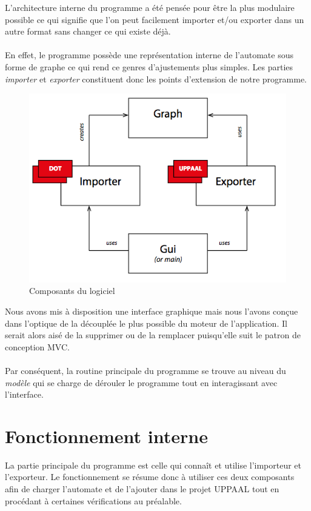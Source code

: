 \documentclass[12pt,a4paper]{report}
\begin{document}
L'architecture interne du programme a été pensée pour être la plus modulaire possible 
ce qui signifie que l'on peut facilement importer et/ou exporter dans un autre format
sans changer ce qui existe déjà. 
\\\\
En effet, le programme possède une représentation interne de l'automate sous forme 
de graphe ce qui rend ce genres d'ajustements plus simples. Les parties \emph{importer}
et \emph{exporter} constituent donc les points d'extension de notre programme.

\begin{figure}[H]
  \centering
  \includegraphics[scale=0.6]{ressources/archi.png}
  \caption{Composants du logiciel}
\end{figure}

Nous avons mis à disposition une interface graphique mais nous l'avons conçue dans l'optique 
de la découplée le plus possible du moteur de l'application. Il serait alors aisé de la supprimer
ou de la remplacer puisqu'elle suit le patron de conception MVC. 
\\\\
Par conséquent, la routine principale du programme se trouve au niveau du 
\emph{modèle} qui se charge de dérouler le programme tout en interagissant 
avec l'interface.

\section{Fonctionnement interne}

La partie principale du programme est celle qui connaît et utilise l'importeur 
et l'exporteur. Le fonctionnement se résume donc à utiliser ces deux composants
afin de charger l'automate et de l'ajouter dans le projet UPPAAL tout en procédant
à certaines vérifications au préalable.
\end{document}
